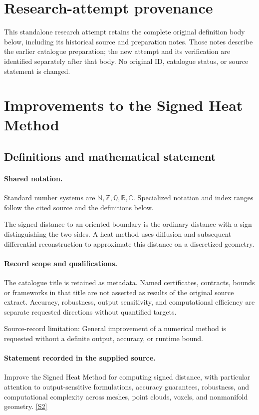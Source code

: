 \documentclass[11pt]{article}
\begin{document}
\section*{Research-attempt provenance}
This standalone research attempt retains the complete original definition body below,
including its historical source and preparation notes. Those notes describe the
earlier catalogue preparation; the new attempt and its verification are identified
separately after that body. No original ID, catalogue status, or source statement is changed.

\section{Improvements to the Signed Heat Method}\label{statement}

\subsection{Definitions and mathematical statement}

\paragraph{Shared notation.}Standard number systems are $\mathbb N,\mathbb Z,\mathbb Q,\mathbb R,\mathbb C$. Specialized notation and index ranges follow the cited source and the definitions below.


The signed distance to an oriented boundary is the ordinary distance with a sign distinguishing the two sides. A heat method uses diffusion and subsequent differential reconstruction to approximate this distance on a discretized geometry.
\paragraph{Record scope and qualifications.}
The catalogue title is retained as metadata. Named certificates, contracts, bounds or frameworks in that title are not asserted as results of the original source extract.
Accuracy, robustness, output sensitivity, and computational efficiency are separate requested directions without quantified targets.

Source-record limitation: General improvement of a numerical method is requested without a definite output, accuracy, or runtime bound.
\paragraph{Statement recorded in the supplied source.}
Improve the Signed Heat Method for computing signed distance, with particular attention to output-sensitive formulations, accuracy guarantees, robustness, and computational complexity across meshes, point clouds, voxels, and nonmanifold geometry. \href{https://doi.org/10.4171/owr/2025/5}{[S2]}
\end{document}
